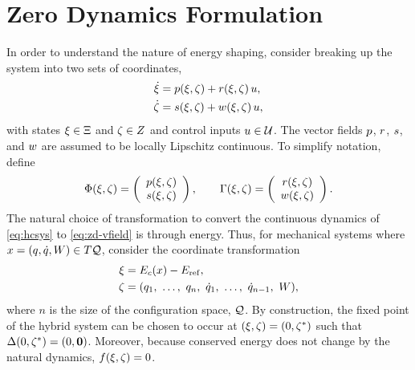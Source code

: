 \section{Zero Dynamics Formulation} \label{sec:zd-form}

In order to understand the nature of energy shaping, consider breaking up the
system into two sets of coordinates,
% 
\begin{align}
  \nonumber
  \dot {\xi} &= p(\xi, \zeta) + r(\xi, \zeta) \, u,\\
  \dot {\zeta} &= s(\xi, \zeta) + w(\xi, \zeta) \, u,
  \label{eq:zd-vfield}
\end{align}
% 
with states $\xi \in \Xi$ and $\zeta \in Z$ and control inputs $u \in
\mathcal{U}$.
% 
The vector fields $p$, $r$, $s$, and $w$ are assumed to be locally
Lipschitz continuous.
% 
To simplify notation, define
% 
\begin{align*}
  \Phi(\xi, \zeta) = \left(\begin{array}{c}
      p(\xi, \zeta)\\
      s(\xi, \zeta)
    \end{array}\right), \qquad
  \Gamma (\xi, \zeta) = \left(\begin{array}{c}
      r(\xi, \zeta)\\
      w(\xi, \zeta)
    \end{array}\right).
\end{align*}
% 
The natural choice of transformation to convert the continuous dynamics of
\eqref{eq:hcsys} to \eqref{eq:zd-vfield} is through energy.
% 
Thus, for mechanical systems where $x = (q, \dot{q}, W) \in T\mathcal{Q}$, consider the
coordinate transformation
% 
\begin{align*}
  \xi &= E_{c}(x) - E_{\mathrm{ref}},\\
  \zeta &= (q_{1}, \ \ldots, \ q_{n}, \ \dot{q}_{1}, \ \ldots, \ \dot{q}_{n-1}, \ W),
\end{align*}
where $n$ is the size of the configuration space, $\mathcal{Q}$.
% 
By construction, the fixed point of the hybrid system can be chosen to occur at
$(\xi, \zeta) = (0, \zeta^{*})$ such that $\Delta(0, \zeta^{*}) = (0, {\mathbf 0})$.
% 
Moreover, because conserved energy does not change by the natural dynamics,
$f(\xi, \zeta) = 0$.
% 

